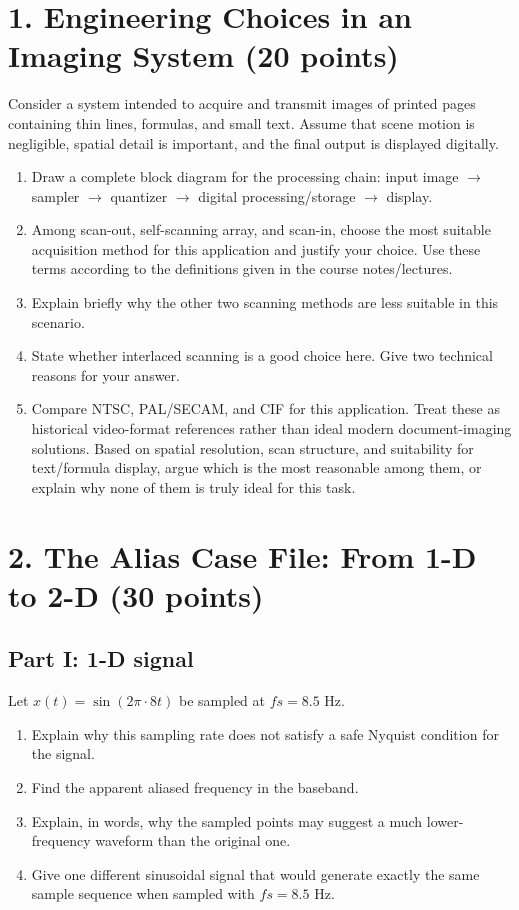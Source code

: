 \LTR

\section*{1. Engineering Choices in an Imaging System (20 points)}

Consider a system intended to acquire and transmit images of printed pages containing thin lines, formulas, and small text. Assume that scene motion is negligible, spatial detail is important, and the final output is displayed digitally.

\begin{enumerate}
    \item[\textbf{(a)}] Draw a complete block diagram for the processing chain: input image $\rightarrow$ sampler $\rightarrow$ quantizer $\rightarrow$ digital processing/storage $\rightarrow$ display.
    \item[\textbf{(b)}] Among scan-out, self-scanning array, and scan-in, choose the most suitable acquisition method for this application and justify your choice. Use these terms according to the definitions given in the course notes/lectures.
    \item[\textbf{(c)}] Explain briefly why the other two scanning methods are less suitable in this scenario.
    \item[\textbf{(d)}] State whether interlaced scanning is a good choice here. Give two technical reasons for your answer.
    \item[\textbf{(e)}] Compare NTSC, PAL/SECAM, and CIF for this application. Treat these as historical video-format references rather than ideal modern document-imaging solutions. Based on spatial resolution, scan structure, and suitability for text/formula display, argue which is the most reasonable among them, or explain why none of them is truly ideal for this task.
\end{enumerate}

\section*{2. The Alias Case File: From 1-D to 2-D (30 points)}

\subsection*{Part I: 1-D signal}
Let $x(t) = \sin(2\pi \cdot 8t)$ be sampled at $fs = 8.5 \text{ Hz}$.

\begin{enumerate}
    \item[\textbf{(a)}] Explain why this sampling rate does not satisfy a safe Nyquist condition for the signal.
    \item[\textbf{(b)}] Find the apparent aliased frequency in the baseband.
    \item[\textbf{(c)}] Explain, in words, why the sampled points may suggest a much lower-frequency waveform than the original one.
    \item[\textbf{(d)}] Give one different sinusoidal signal that would generate exactly the same sample sequence when sampled with $fs = 8.5 \text{ Hz}$.
\end{enumerate}

